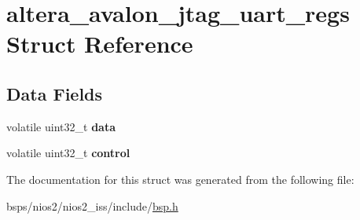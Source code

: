 \hypertarget{structaltera__avalon__jtag__uart__regs}{}\section{altera\+\_\+avalon\+\_\+jtag\+\_\+uart\+\_\+regs Struct Reference}
\label{structaltera__avalon__jtag__uart__regs}
\subsection*{Data Fields}
\begin{DoxyCompactItemize}
\item 
\mbox{\label{structaltera__avalon__jtag__uart__regs_aab66285da1f357923572f0f3944e09cf}} 
volatile uint32\+\_\+t {\bfseries data}
\item 
\mbox{\label{structaltera__avalon__jtag__uart__regs_a3c8b9b7331d84a5b941e41eb41378ff5}} 
volatile uint32\+\_\+t {\bfseries control}
\end{DoxyCompactItemize}


The documentation for this struct was generated from the following file\+:\begin{DoxyCompactItemize}
\item 
bsps/nios2/nios2\+\_\+iss/include/\mbox{\hyperlink{bsps_2nios2_2nios2__iss_2include_2bsp_8h}{bsp.\+h}}\end{DoxyCompactItemize}

